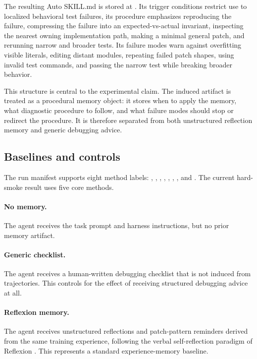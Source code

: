 The resulting Auto SKILL.md is stored at . Its trigger conditions restrict use to localized behavioral test failures, its procedure emphasizes reproducing the failure, compressing the failure into an expected-vs-actual invariant, inspecting the nearest owning implementation path, making a minimal general patch, and rerunning narrow and broader tests. Its failure modes warn against overfitting visible literals, editing distant modules, repeating failed patch shapes, using invalid test commands, and passing the narrow test while breaking broader behavior.

This structure is central to the experimental claim. The induced artifact is treated as a procedural memory object: it stores when to apply the memory, what diagnostic procedure to follow, and what failure modes should stop or redirect the procedure. It is therefore separated from both unstructured reflection memory and generic debugging advice.

\subsection{Baselines and controls}
\label{sec:method_baselines}

The run manifest supports eight method labels: , , , , , , , and . The current hard-smoke result uses five core methods.

\paragraph{No memory.} The agent receives the task prompt and harness instructions, but no prior memory artifact.

\paragraph{Generic checklist.} The agent receives a human-written debugging checklist that is not induced from trajectories. This controls for the effect of receiving structured debugging advice at all.

\paragraph{Reflexion memory.} The agent receives unstructured reflections and patch-pattern reminders derived from the same training experience, following the verbal self-reflection paradigm of Reflexion \cite{shinn2023reflexion}. This represents a standard experience-memory baseline.

